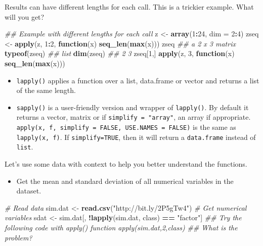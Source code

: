 \documentclass[12pt,]{krantz}
\makeatletter
\newenvironment{Shaded}{\begin{snugshade}}{\end{snugshade}}
\newcommand{\CommentTok}[1]{\textcolor[rgb]{0.37,0.37,0.37}{\textit{#1}}}
\newcommand{\ControlFlowTok}[1]{\textcolor[rgb]{0.27,0.27,0.27}{\textbf{#1}}}
\newcommand{\DataTypeTok}[1]{\textcolor[rgb]{0.27,0.27,0.27}{#1}}
\newcommand{\DecValTok}[1]{\textcolor[rgb]{0.06,0.06,0.06}{#1}}
\newcommand{\KeywordTok}[1]{\textcolor[rgb]{0.27,0.27,0.27}{\textbf{#1}}}
\newcommand{\NormalTok}[1]{#1}
\newcommand{\OperatorTok}[1]{\textcolor[rgb]{0.43,0.43,0.43}{\textbf{#1}}}
\newcommand{\StringTok}[1]{\textcolor[rgb]{0.5,0.5,0.5}{#1}}
\providecommand{\tightlist}{%
  \setlength{\itemsep}{0pt}\setlength{\parskip}{0pt}}
\newenvironment{kframe}{%
\medskip{}
\setlength{\fboxsep}{.8em}
 \def\at@end@of@kframe{}%
 \ifinner\ifhmode%
  \def\at@end@of@kframe{\end{minipage}}%
  \begin{minipage}{\columnwidth}%
 \fi\fi%
 \def\FrameCommand##1{\hskip\@totalleftmargin \hskip-\fboxsep
 \colorbox{shadecolor}{##1}\hskip-\fboxsep
     \hskip-\linewidth \hskip-\@totalleftmargin \hskip\columnwidth}%
 \MakeFramed {\advance\hsize-\width
   \@totalleftmargin\z@ \linewidth\hsize
   \@setminipage}}%
 {\par\unskip\endMakeFramed%
 \at@end@of@kframe}
\renewenvironment{Shaded}{\begin{kframe}}{\end{kframe}}
\makeatother
\begin{document}
Results can have different lengths for each call. This is a trickier example. What will you get?

\begin{Shaded}
\begin{Highlighting}[]
\CommentTok{## Example with different lengths for each call}
\NormalTok{z <-}\StringTok{ }\KeywordTok{array}\NormalTok{(}\DecValTok{1}\OperatorTok{:}\DecValTok{24}\NormalTok{, }\DataTypeTok{dim =} \DecValTok{2}\OperatorTok{:}\DecValTok{4}\NormalTok{)}
\NormalTok{zseq <-}\StringTok{ }\KeywordTok{apply}\NormalTok{(z, }\DecValTok{1}\OperatorTok{:}\DecValTok{2}\NormalTok{, }\ControlFlowTok{function}\NormalTok{(x) }\KeywordTok{seq_len}\NormalTok{(}\KeywordTok{max}\NormalTok{(x)))}
\NormalTok{zseq         }\CommentTok{## a 2 x 3 matrix}
\KeywordTok{typeof}\NormalTok{(zseq) }\CommentTok{## list}
\KeywordTok{dim}\NormalTok{(zseq) }\CommentTok{## 2 3}
\NormalTok{zseq[}\DecValTok{1}\NormalTok{,]}
\KeywordTok{apply}\NormalTok{(z, }\DecValTok{3}\NormalTok{, }\ControlFlowTok{function}\NormalTok{(x) }\KeywordTok{seq_len}\NormalTok{(}\KeywordTok{max}\NormalTok{(x)))}
\end{Highlighting}
\end{Shaded}

\begin{itemize}
\tightlist
\item
  \texttt{lapply()} applies a function over a list, data.frame or vector and returns a list of the same length.
\item
  \texttt{sapply()} is a user-friendly version and wrapper of \texttt{lapply()}. By default it returns a vector, matrix or if \texttt{simplify\ =\ "array"}, an array if appropriate. \texttt{apply(x,\ f,\ simplify\ =\ FALSE,\ USE.NAMES\ =\ FALSE)} is the same as \texttt{lapply(x,\ f)}. If \texttt{simplify=TRUE}, then it will return a \texttt{data.frame} instead of \texttt{list}.
\end{itemize}

Let's use some data with context to help you better understand the functions.

\begin{itemize}
\tightlist
\item
  Get the mean and standard deviation of all numerical variables in the dataset.
\end{itemize}

\begin{Shaded}
\begin{Highlighting}[]
\CommentTok{# Read data}
\NormalTok{sim.dat <-}\StringTok{ }\KeywordTok{read.csv}\NormalTok{(}\StringTok{"http://bit.ly/2P5gTw4"}\NormalTok{)}
\CommentTok{# Get numerical variables}
\NormalTok{sdat <-}\StringTok{ }\NormalTok{sim.dat[, }\OperatorTok{!}\KeywordTok{lapply}\NormalTok{(sim.dat, class) }\OperatorTok{==}\StringTok{ "factor"}\NormalTok{]}
\CommentTok{## Try the following code with apply() function apply(sim.dat,2,class)}
\CommentTok{## What is the problem?}
\end{Highlighting}
\end{Shaded}
\end{document}
